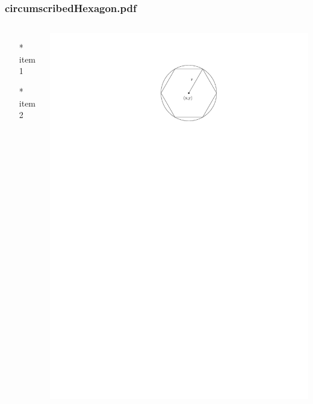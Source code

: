 \begin{frame} \frametitle{circumscribedHexagon.pdf}
    \begin{columns}[c]
        \begin{itemize}
            \item[*] item 1
            \item[*] item 2
        \end{itemize}
        \begin{minipage}{\linewidth}
            \begin{center}
            \includegraphics[width=.9\textwidth]{graphics/circumscribedHexagon.pdf}
            \label{gfx:circumscribedHexagon.pdf}
            \end{center}
        \end{minipage}
    \end{columns}
\end{frame}
